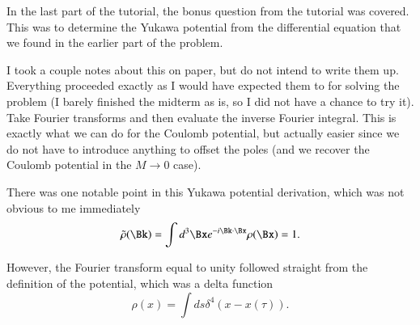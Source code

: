%
%
%
%
In the last part of the tutorial, the bonus question from the tutorial was covered.  This was to determine the Yukawa potential from the differential equation that we found in the earlier part of the problem.

I took a couple notes about this on paper, but do not intend to write them up.  Everything proceeded exactly as I would have expected them to for solving the problem (I barely finished the midterm as is, so I did not have a chance to try it).  Take Fourier transforms and then evaluate the inverse Fourier integral.  This is exactly what we can do for the Coulomb potential, but actually easier since we do not have to introduce anything to offset the poles (and we recover the Coulomb potential in the \(M \rightarrow 0\) case).

There was one notable point in this Yukawa potential derivation, which was not obvious to me immediately
%
\begin{equation}\label{eqn:relativisticElectrodynamicsT8:350}
\tilde{\rho}(\Bk) = \int d^3 \Bx e^{-i \Bk \cdot \Bx} \rho(\Bx) = 1.
\end{equation}

However, the Fourier transform equal to unity followed straight from the definition of the potential, which was a delta function
%
\begin{equation}\label{eqn:relativisticElectrodynamicsT8:340}
\rho(x) = \int ds \delta^4(x - x(\tau)).
\end{equation}

